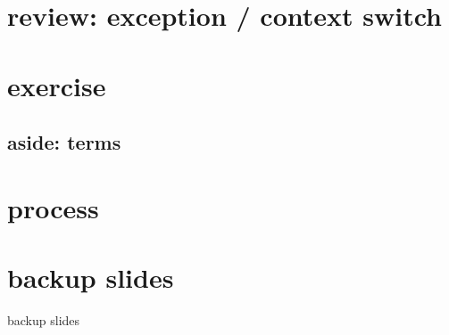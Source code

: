 \section{review: exception / context switch}


\section{exercise}


\subsection{aside: terms}


\section{process}




\section{backup slides}
\begin{frame}{backup slides}
\end{frame}


